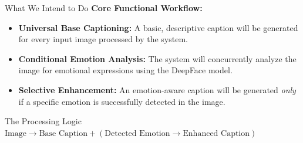 \documentclass{beamer}
\begin{document}
\begin{frame}{What We Intend to Do}
    \textbf{Core Functional Workflow:}
    \begin{itemize}
        \item \textbf{Universal Base Captioning:} 
        A basic, descriptive caption will be generated for every input image processed by the system.
        
        \item \textbf{Conditional Emotion Analysis:} 
        The system will concurrently analyze the image for emotional expressions using the DeepFace model.
        
        \item \textbf{Selective Enhancement:} 
        An emotion-aware caption will be generated \textit{only} if a specific emotion is successfully detected in the image.
    \end{itemize}

    \vspace{0.5cm}

    \begin{block}{The Processing Logic}
        \centering
        $\text{Image} \rightarrow \text{Base Caption} + (\text{Detected Emotion} \rightarrow \text{Enhanced Caption})$
    \end{block}

\end{frame}
\end{document}
